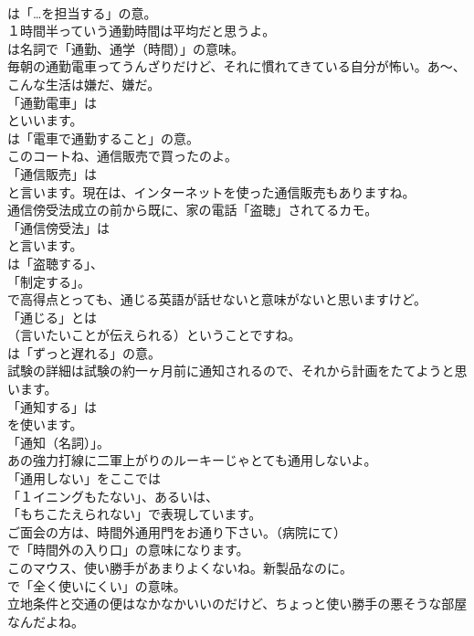 \documentclass[8pt]{extreport}
\begin{document}
\begin{CJK}{UTF8}{min}
\\	は「…を担当する」の意。	
\\	１時間半っていう通勤時間は平均だと思うよ。 
\\	は名詞で「通勤、通学（時間）」の意味。	
\\	毎朝の通勤電車ってうんざりだけど、それに慣れてきている自分が怖い。あ～、こんな生活は嫌だ、嫌だ。 
\\	「通勤電車」は 
\\	といいます。
\\	は「電車で通勤すること」の意。	
\\	このコートね、通信販売で買ったのよ。 
\\	「通信販売」は
\\	と言います。現在は、インターネットを使った通信販売もありますね。	
\\	通信傍受法成立の前から既に、家の電話「盗聴」されてるカモ。 
\\	「通信傍受法」は
\\	と言います。
\\	は「盗聴する」、
\\	「制定する」。	
\\	で高得点とっても、通じる英語が話せないと意味がないと思いますけど。 
\\	「通じる」とは
\\	（言いたいことが伝えられる）ということですね。
\\	は「ずっと遅れる」の意。	
\\	試験の詳細は試験の約一ヶ月前に通知されるので、それから計画をたてようと思います。 
\\	「通知する」は
\\	を使います。
\\	「通知（名詞）」。	
\\	あの強力打線に二軍上がりのルーキーじゃとても通用しないよ。 
\\	「通用しない」をここでは
\\	「１イニングもたない」、あるいは、
\\	「もちこたえられない」で表現しています。	
\\	ご面会の方は、時間外通用門をお通り下さい。（病院にて） 
\\	で「時間外の入り口」の意味になります。	
\\	このマウス、使い勝手があまりよくないね。新製品なのに。 
\\	で「全く使いにくい」の意味。	
\\	立地条件と交通の便はなかなかいいのだけど、ちょっと使い勝手の悪そうな部屋なんだよね。 

\end{CJK}
\end{document}
